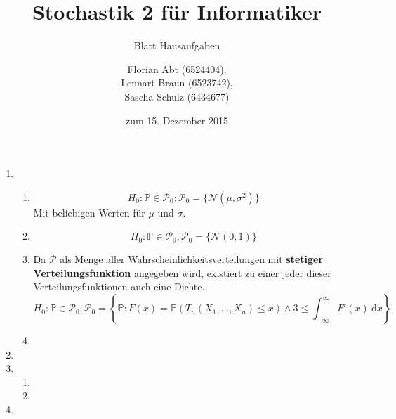 \documentclass[a4paper]{scrartcl}
\title{Stochastik 2 für Informatiker}
\subtitle{Blatt {\blattnr} Hausaufgaben}
\author{
    Florian Abt (6524404), \\
    Lennart Braun (6523742), \\
    Sascha Schulz (6434677)
}
\date{zum 15. Dezember 2015}
\newcommand{\dif}{\ \mathrm{d}}
\def \blattnr {9}
\begin{document}
\maketitle

\begin{enumerate}[label=\bfseries \blattnr.\arabic*]

    \item 
      \begin{enumerate}
       \item 
        \begin{equation*}
	  H_0: \mathbb{P} \in \mathcal{P}_0; \mathcal{P}_0 = \{ \mathcal{N}(\mu,\sigma^2) \}
	\end{equation*}
	Mit beliebigen Werten für $\mu$ und $\sigma$.
       \item 
	\begin{equation*}
	  H_0: \mathbb{P} \in \mathcal{P}_0; \mathcal{P}_0 = \{ \mathcal{N}(0,1) \}
	\end{equation*}
       \item 
	Da $\mathcal{P}$ als Menge aller Wahrscheinlichkeitsverteilungen mit 
	\textbf{stetiger Verteilungsfunktion} angegeben wird, existiert zu einer 
	jeder dieser Verteilungsfunktionen auch eine Dichte.
	\begin{equation*}
	  H_0: \mathbb{P} \in \mathcal{P}_0; \mathcal{P}_0 = 
	   \left\{ \mathbb{P} : F(x)=\mathbb{P}(T_n(X_1,\ldots,X_n) \leq x) \wedge 3 \leq \int_{-\infty}^{\infty} F'(x) \dif x \right\}
	\end{equation*}
       \item 
      \end{enumerate}

    \item 
    
    \item 
      \begin{enumerate}
       \item 
       \item 
      \end{enumerate}

    \item 
      

\end{enumerate}
\end{document}
